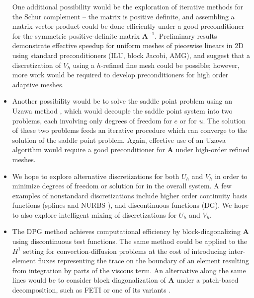 \documentclass[final,leqno]{siamltex}
\newcommand{\bs}[1]{\boldsymbol{#1}}
\begin{document}
\begin{itemize}
One additional possibility would be the exploration of iterative methods for the Schur complement -- the matrix is positive definite, and assembling a matrix-vector product could be done efficiently under a good preconditioner for the symmetric positive-definite matrix $\bs{A}^{-1}$.  Preliminary results demonstrate effective speedup for uniform meshes of piecewise linears in 2D using standard preconditioners (ILU, block Jacobi, AMG), and suggest that a discretization of $V_h$ using a $h$-refined fine mesh could be possible; however, more work would be required to develop preconditioners for high order adaptive meshes.  
\item Another possibility would be to solve the saddle point problem using an Uzawa method \cite{uzawa}, which would decouple the saddle point system into two problems, each involving only degrees of freedom for $e$ or for $u$.  The solution of these two problems feeds an iterative procedure which can converge to the solution of the saddle point problem.  Again, effective use of an Uzawa algorithm would require a good preconditioner for $\bs{A}$ under high-order refined meshes.
\item We hope to explore alternative discretizations for both $U_h$ and $V_h$ in order to minimize degrees of freedom or solution for in the overall system.  A few examples of nonstandard discretizations include higher order continuity basis functions (splines and NURBS \cite{NURBSorig}), and discontinuous functions (DG).  We hope to also explore intelligent mixing of discretizations for $U_h$ and $V_h$.  
\item The DPG method achieves computational efficiency by block-diagonalizing $\bs{A}$ using discontinuous test functions.  The same method could be applied to the $H^1$ setting for convection-diffusion problems at the cost of introducing inter-element fluxes representing the trace on the boundary of an element resulting from integration by parts of the viscous term.  An alternative along the same lines would be to consider block diagonalization of $\bs{A}$ under a patch-based decomposition, such as FETI or one of its variants \cite{FETI1,FETI2}.  
\end{itemize}
\newpage


\end{document}
